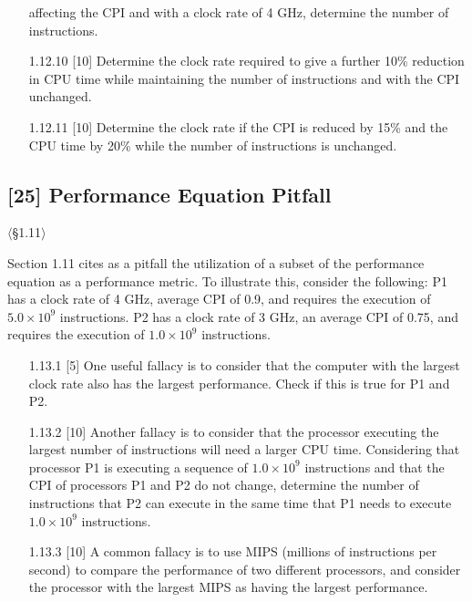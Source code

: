 \begin{enumerate}
        affecting the CPI and with a clock rate of 4 GHz, determine the
        number of instructions.
  \item[1.12.10] [10] Determine the clock rate required to give a further
        10\% reduction in CPU time while maintaining the number of
        instructions and with the CPI unchanged.
  \item[1.12.11] [10] Determine the clock rate if the CPI is reduced by
        15\% and the CPU time by 20\% while the number of instructions is
        unchanged.
\end{enumerate}

\problembreak %

\subsection{[25] Performance Equation Pitfall}
\hypertarget{prob-1.13}{}
\noindent$\langle$\S1.11$\rangle$\medskip

\noindent Section 1.11 cites as a pitfall the utilization of a subset of the
performance equation as a performance metric. To illustrate this, consider the
following: P1 has a clock rate of 4 GHz, average CPI of 0.9, and requires the
execution of $5.0 \times 10^9$ instructions. P2 has a clock rate of 3 GHz, an
average CPI of 0.75, and requires the execution of $1.0 \times 10^9$
instructions.

\begin{enumerate}
  \item[1.13.1] [5] One useful fallacy is to consider that the computer with the
        largest clock rate also has the largest performance. Check if this is
        true for P1 and P2.
  \item[1.13.2] [10] Another fallacy is to consider that the processor executing
        the largest number of instructions will need a larger CPU time.
        Considering that processor P1 is executing a sequence of
        $1.0 \times 10^9$ instructions and that the CPI of processors P1 and
        P2 do not change, determine the number of instructions that P2 can
        execute in the same time that P1 needs to execute
        $1.0 \times 10^9$ instructions.
  \item[1.13.3] [10] A common fallacy is to use MIPS (millions of instructions per
        second) to compare the performance of two different processors, and
        consider the processor with the largest MIPS as having the largest
        performance.
\end{enumerate}

